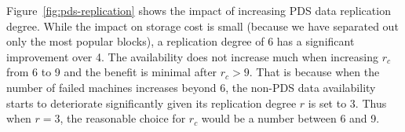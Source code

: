

%
Figure~\ref{fig:pds-replication} shows
the impact of increasing PDS data replication degree. 
While the impact on storage cost is small (because we have separated out only
the most popular blocks),
a replication degree of 6  has a significant improvement over 4. The
availability does not increase much  when increasing
$r_c$ from 6 to 9 and the benefit is minimal after $r_c>9$. 
That is because when the number of failed machines increases beyond 6, 
the non-PDS data availability starts to deteriorate significantly given its replication degree
$r$ is set to 3. Thus when $r=3$, the reasonable choice for $r_c$ would be a number between 6 and 9.
 


